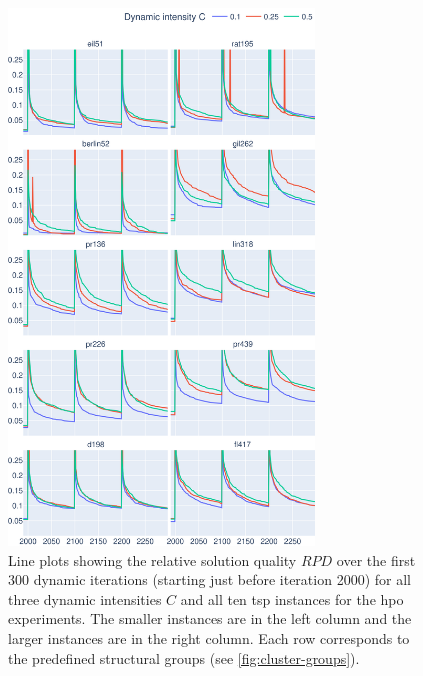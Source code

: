 \begin{figure}[p]
	\centering
	\includegraphics[width=0.725\textwidth]{results/part3/run_plot_cmp_dynamic_aggr_problem_y_best_solution_1_to_30_HPO.svg}
	\caption[Line plots showing the relative solution quality $RPD$ over dynamic iterations for all dynamic intensities $C$ and all \gls{tsp} instances for the \gls{hpo} experiments.]{Line plots showing the relative solution quality $RPD$ over the first 300 dynamic iterations (starting just before iteration 2000) for all three dynamic intensities $C$ and all ten \gls{tsp} instances for the \gls{hpo} experiments. The smaller instances are in the left column and the larger instances are in the right column. Each row corresponds to the predefined structural groups (see \cref{fig:cluster-groups}).}
	\label{fig:run_plot_cmp_dynamic_aggr_problem_HPO}
\end{figure}

